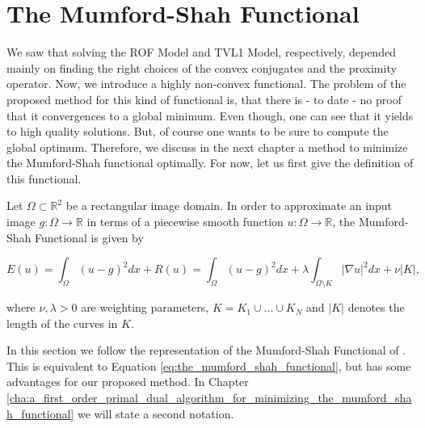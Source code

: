 \section{The Mumford-Shah Functional} %
\label{sec:the_mumford_shah_functional}
    
    We saw that solving the ROF Model and TVL1 Model, respectively, depended mainly on finding the right choices of the convex conjugates and the proximity operator. Now, we introduce a highly non-convex functional. The problem of the proposed method for this kind of functional is, that there is - to date - no proof that it convergences to a global minimum. Even though, one can see that it yields to high quality solutions. But, of course one wants to be sure to compute the global optimum. Therefore, we discuss in the next chapter a method to minimize the Mumford-Shah functional optimally. For now, let us first give the definition of this functional.

    \begin{definition} %
    \label{def:the_mumford_shah_functional}

        Let $\Omega \subset \mathbb{R}^{2}$ be a rectangular image domain. In order to approximate an input image $g: \Omega \longrightarrow \mathbb{R}$ in terms of a piecewise smooth function $u: \Omega \longrightarrow \mathbb{R}$, the Mumford-Shah Functional is given by
                
                \begin{equation}
                    E(u) = \int_{\Omega} (u - g)^{2} dx + R(u) = \int_{\Omega} (u - g)^{2} dx + \lambda \int_{\Omega \setminus K} |\nabla u|^{2} dx + \nu |K|,
                \end{equation}
                \label{eq:the_mumford_shah_functional}
            
            where $\nu, \lambda > 0$ are weighting parameters, $K = K_{1} \cup ... \cup K_{N}$ and $|K|$ denotes the length of the curves in $K$.

    \end{definition}

    \begin{remark}
        In this section we follow the representation of the Mumford-Shah Functional of \cite{Strekalovskiy-Cremers-eccv14}. This is equivalent to Equation \ref{eq:the_mumford_shah_functional}, but has some advantages for our proposed method. In Chapter \ref{cha:a_first_order_primal_dual_algorithm_for_minimizing_the_mumford_shah_functional} we will state a second notation.
    \end{remark}


